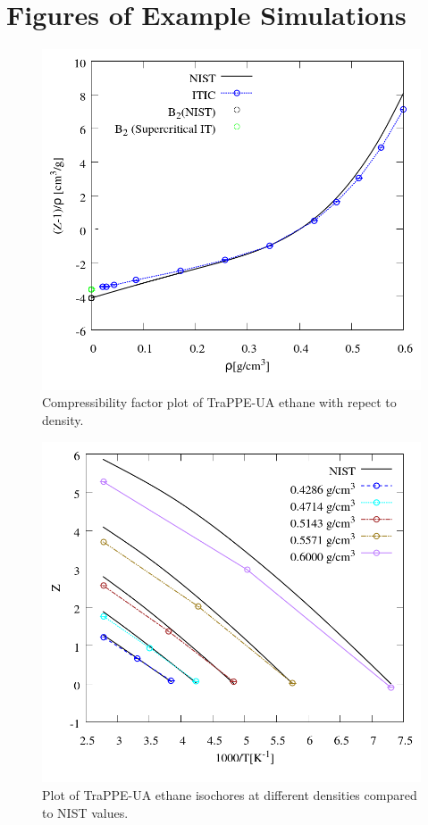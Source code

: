 \documentclass[%
 aip,
 jcp,
 sd,%
 amsmath,amssymb,
]{revtex4-1}
\begin{document}
\clearpage
\section{Figures of Example Simulations}

\begin{figure}[!htbp]
\includegraphics[scale=0.35]{Figures/EXAMPLE-SIM_TraPPE-C2_zrho.png}
\caption{Compressibility factor plot of TraPPE-UA ethane with repect to density. }
\label{fig:EXAMPLE-SIM/TraPPE-C2/zrho}
\end{figure}

\begin{figure}[!htbp]
\includegraphics[scale=0.35]{Figures/EXAMPLE-SIM_TraPPE-C2_zt.png}
\caption{Plot of TraPPE-UA ethane isochores at different densities compared to NIST values.}
\label{fig:EXAMPLE-SIM/TraPPE-C2/zt}
\end{figure}
\end{document}
